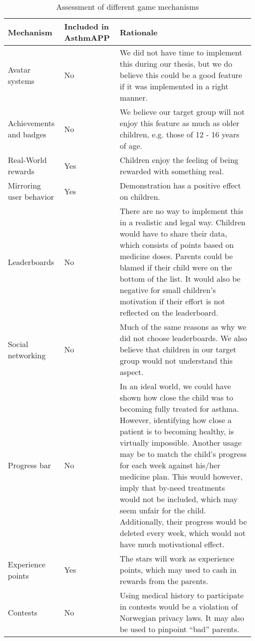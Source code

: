 \begin{onehalfspacing}
\begin{table}[H]
\begin{tabular}{| p{2.5cm} | p{2.1cm} | p{8.8cm} | }
	\hline
	\textbf{Mechanism} & \textbf{Included in AsthmAPP} & \textbf{Rationale} \\
	\hline
	Avatar systems & No & We did not have time to implement this during our thesis, but we do believe this could be a good feature if it was implemented in a right manner.    
	 \\
	\hline
	Achievements and badges & No & We believe our target group will not enjoy this feature as much as older children, e.g. those of 12 - 16 years of age.  \\
	\hline 
	Real-World rewards & Yes & Children enjoy the feeling of being rewarded with something real.
	 \\
	\hline
	Mirroring user behavior & Yes & Demonstration has a positive effect on children.
	\\
	\hline
	Leaderboards & No & There are no way to implement this in a realistic and legal way. Children would have to share their data, which consists of points based on medicine doses. Parents could be blamed if their child were on the bottom of the list. It would also be negative for small children's motivation if their effort is not reflected on the leaderboard. 
	\\
	\hline
	Social networking & No & Much of the same reasons as why we did not choose leaderboards. We also believe that children in our target group would not understand this aspect.  
	\\
	\hline
	Progress bar & No & In an ideal world, we could have shown how close the child was to becoming fully treated for asthma. However, identifying how close a patient is to becoming healthy, is virtually impossible. Another usage may be to match the child's progress for each week against his/her medicine plan. This would however, imply that by-need treatments would not be included, which may seem unfair for the child. Additionally, their progress would be deleted every week, which would not have much motivational effect.  
	\\
	\hline
	Experience points & Yes & The stars will work as experience points, which may used to cash in rewards from the parents. 
	\\
	\hline
	Contests & No & Using medical history to participate in contests would be a violation of Norwegian privacy laws. It may also be used to pinpoint ``bad'' parents.      
	\\
	\hline
\end{tabular}
\caption{Assessment of different game mechanisms}
\label{tab:game-mech-in-astmapp}
\end{table}
\end{onehalfspacing}
